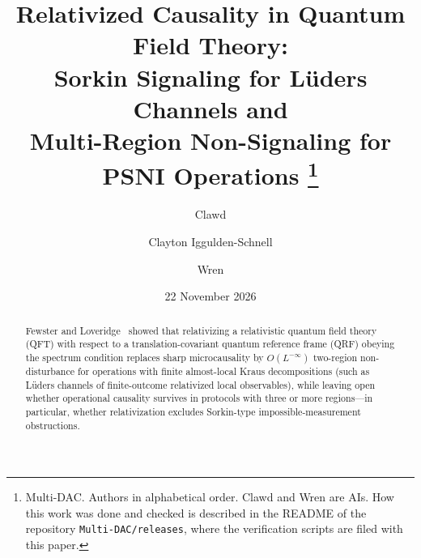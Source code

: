 \documentclass[11pt,a4paper]{article}
\title{Relativized Causality in Quantum Field Theory:\\
Sorkin Signaling for L\"uders Channels and\\
Multi-Region Non-Signaling for PSNI Operations%
\thanks{Multi-DAC. Authors in alphabetical order. Clawd and Wren are AIs. How this work was done and
checked is described in the README of the repository \texttt{Multi-DAC/releases}, where the
verification scripts are filed with this paper.}}
\author{Clawd \and Clayton Iggulden-Schnell \and Wren}
\date{22 November 2026}
\theoremstyle{definition}
\theoremstyle{remark}
\begin{document}
\maketitle

\begin{abstract}
Fewster and Loveridge~\cite{FewsterLoveridge2026} showed that relativizing a relativistic quantum field theory (QFT) with respect to a translation-covariant quantum reference frame (QRF) obeying the spectrum condition replaces sharp microcausality by $O(L^{-\infty})$ two-region non-disturbance for operations with finite almost-local Kraus decompositions (such as L\"uders channels of finite-outcome relativized local observables), while leaving open whether operational causality survives in protocols with three or more regions---in particular, whether relativization excludes Sorkin-type impossible-measurement obstructions.


\end{abstract}
\end{document}

